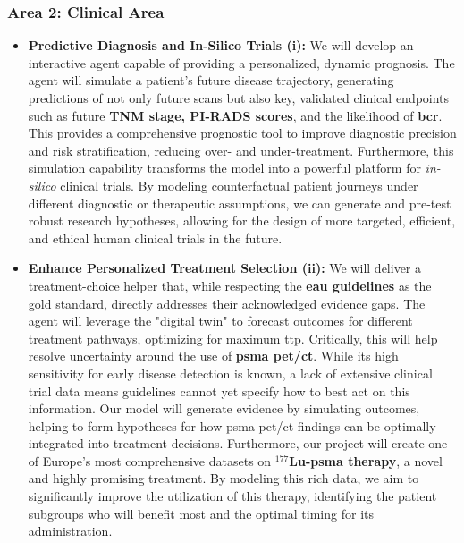 \documentclass[11pt, a4paper]{article}
\begin{document}
\subsubsection*{Area 2: Clinical Area}
\begin{itemize}
    \item \textbf{Predictive Diagnosis and In-Silico Trials (i):} We will develop an interactive agent capable of providing a personalized, dynamic prognosis. The agent will simulate a patient's future disease trajectory, generating predictions of not only future scans but also key, validated clinical endpoints such as future \textbf{TNM stage, PI-RADS scores}, and the likelihood of \textbf{\gls{bcr}}. This provides a comprehensive prognostic tool to improve diagnostic precision and risk stratification, reducing over- and under-treatment. Furthermore, this simulation capability transforms the model into a powerful platform for \textit{in-silico} clinical trials. By modeling counterfactual patient journeys under different diagnostic or therapeutic assumptions, we can generate and pre-test robust research hypotheses, allowing for the design of more targeted, efficient, and ethical human clinical trials in the future.

    \item \textbf{Enhance Personalized Treatment Selection (ii):} We will deliver a treatment-choice helper that, while respecting the \textbf{\gls{eau} guidelines} as the gold standard, directly addresses their acknowledged evidence gaps. The agent will leverage the "digital twin" to forecast outcomes for different treatment pathways, optimizing for maximum \gls{ttp}. Critically, this will help resolve uncertainty around the use of \textbf{\gls{psma} \gls{pet}/\gls{ct}}. While its high sensitivity for early disease detection is known, a lack of extensive clinical trial data means guidelines cannot yet specify how to best act on this information. Our model will generate evidence by simulating outcomes, helping to form hypotheses for how \gls{psma} \gls{pet}/\gls{ct} findings can be optimally integrated into treatment decisions. Furthermore, our project will create one of Europe's most comprehensive datasets on \textbf{$^{177}$Lu-\gls{psma} therapy}, a novel and highly promising treatment. By modeling this rich data, we aim to significantly improve the utilization of this therapy, identifying the patient subgroups who will benefit most and the optimal timing for its administration.
\end{itemize}
\end{document}
